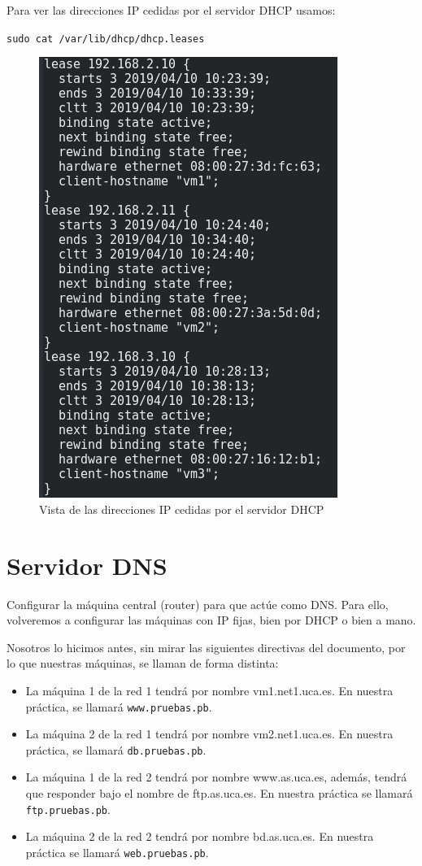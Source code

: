 \documentclass[12pt,letterpaper]{article}
\begin{document}
Para ver las direcciones IP cedidas por el servidor DHCP usamos:
\begin{center}
	\texttt{sudo cat /var/lib/dhcp/dhcp.leases}
\end{center}
\newpage
\begin{figure}[h]
	\centering
	\includegraphics[scale=0.8]{DHCP3.png}
	\caption{Vista de las direcciones IP cedidas por el servidor DHCP}
\end{figure}

\section{Servidor DNS}
Configurar la máquina central (router) para que actúe como DNS. Para ello, volveremos a configurar las máquinas con IP fijas, bien por DHCP o bien a mano.

Nosotros lo hicimos antes, sin mirar las siguientes directivas del documento, por lo que nuestras máquinas, se llaman de forma distinta:
\begin{itemize}
	\item La máquina 1 de la red 1 tendrá por nombre vm1.net1.uca.es. En nuestra práctica, se llamará \texttt{www.pruebas.pb}.
	\item La máquina 2 de la red 1 tendrá por nombre vm2.net1.uca.es. En nuestra práctica, se llamará \texttt{db.pruebas.pb}.
	\item La máquina 1 de la red 2 tendrá por nombre www.as.uca.es, además, tendrá que responder bajo el nombre de ftp.as.uca.es. En nuestra práctica se llamará \texttt{ftp.pruebas.pb}.
	\item La máquina 2 de la red 2 tendrá por nombre bd.as.uca.es. En nuestra práctica se llamará \texttt{web.pruebas.pb}.
\end{itemize}
\end{document}

